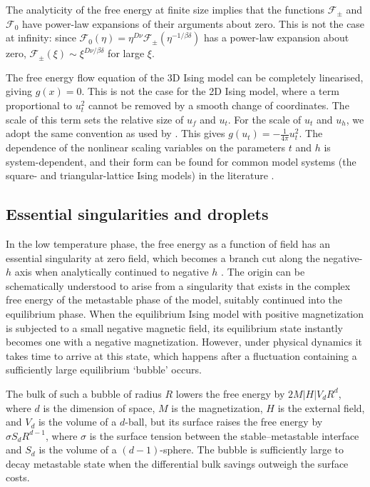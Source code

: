 \documentclass[
  aps,
  pre,
  reprint,
  longbibliography,
  floatfix
]{revtex4-2}
\begin{document}
The analyticity of the free energy at finite size implies that the functions
$\mathcal F_\pm$ and $\mathcal F_0$ have power-law expansions of their
arguments about zero. This is not the case at infinity: since $\mathcal
F_0(\eta)=\eta^{D\nu}\mathcal F_\pm(\eta^{-1/\beta\delta})$ has
a power-law expansion about zero, $\mathcal F_\pm(\xi)\sim
\xi^{D\nu/\beta\delta}$ for large $\xi$.

The free energy flow equation of the 3D Ising model can be completely linearised, giving $g(x)=0$. This is not the case for the 2D Ising model, where a term proportional to $u_t^2$ cannot be removed by a smooth change of coordinates. The scale of this term sets the relative size of $u_f$ and $u_t$.
For the scale of $u_t$ and $u_h$, we adopt the same convention as used by
\cite{Fonseca_2003_Ising}. This gives $g(u_t)=-\frac1{4\pi}u_t^2$. The dependence of the nonlinear scaling variables on
the parameters $t$ and $h$ is system-dependent, and their form can be
found for common model systems (the square- and triangular-lattice Ising
models) in the literature \cite{Clement_2019_Respect}.



\subsection{Essential singularities and droplets}


In the low temperature phase, the free energy as a function of field has an essential singularity at zero field, which becomes a branch cut along the negative-$h$ axis when analytically continued to negative $h$ \cite{Langer_1967_Theory}. The origin can be schematically understood to arise from a
singularity that exists in the complex free energy of the metastable phase of
the model, suitably continued into the equilibrium phase. When the equilibrium
Ising model with positive magnetization is subjected to a small negative
magnetic field, its equilibrium state instantly becomes one with a negative
magnetization. However, under physical dynamics it takes time to arrive at this
state, which happens after a fluctuation containing a sufficiently large
equilibrium `bubble' occurs.

The bulk of such a bubble of radius $R$ lowers the free energy by
$2M|H|V_dR^d$, where $d$ is the dimension of space, $M$ is the magnetization,
$H$ is the external field, and $V_d$ is the volume of a $d$-ball, but its
surface raises the free energy by $\sigma S_dR^{d-1}$, where $\sigma$ is the
surface tension between the stable--metastable interface and $S_d$ is the
volume of a $(d-1)$-sphere. The bubble is sufficiently large to decay
metastable state when the differential bulk savings outweigh the surface costs.
\end{document}
